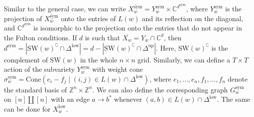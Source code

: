 \documentclass[11pt]{amsart}
\theoremstyle{definition}
\theoremstyle{definition}
\theoremstyle{definition}
\theoremstyle{definition}
\newcommand{\SW}{\mathrm{SW}}
\newcommand{\sym}{\mathrm{sym}}
\newcommand{\low}{\mathrm{low}}
\begin{document}
Similar to the general case, we can write 
$\overline{X_w^{\sym}} = Y_w^{\sym} \times \mathbb C^{d^{\sym}}$, where $Y_w^{\sym}$ is the projection of $\overline{X_w^{\sym}}$ onto the entries of $L(w)$ and its reflection on the diagonal,
and $\mathbb C^{d^{\sym}}$
is isomorphic to the projection onto the entries that do not appear in the Fulton conditions. If $d$ is such that $\overline{X_w} = Y_w \cap \mathbb C^d$, then $d^{\sym} =  |\SW(w)^{\complement} \cap \Delta^{\low}| = d - |\SW(w)^{\complement} \cap \Delta^{\textrm{up}}|$. Here, $\SW(w)^{\complement}$ is the complement of $\SW(w)$ in the whole $n\times n$ grid.
Similarly, we can define a $T \times T$ action of the subvariety $Y_w^{\sym}$ with weight cone
$\sigma_w^{\sym} = \textrm{Cone}(e_i -f_j \mid (i,j) \in L(w) \cap \Delta^{\low})$, where $e_1, \ldots, e_n, f_1, \ldots, f_n$ denote the standard basis of $\mathbb Z^n \times \mathbb Z^n$.
We can also define the corresponding graph $G_w^{\sym}$ on $[n] \amalg [n]$ with an edge $a \rightarrow b^*$ whenever $(a,b) \in L(w) \cap \Delta^{\low}$.
The same can be done for $X_w^{\low}$.
\end{document}
